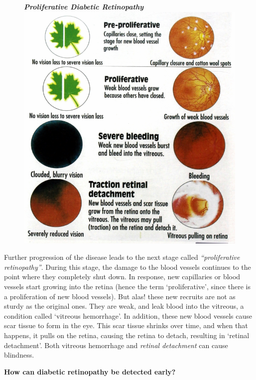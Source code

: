 \begin{figure}
\centering
\textbf{\textit{Proliferative Diabetic Retinopathy}}\\
\includegraphics[scale=1.5]{images/055.jpg}
\end{figure}

Further progression of the disease leads to the next stage called \textit{“proliferative retinopa\-thy”}. During this stage, the damage to the blood vessels continues to the point where they completely shut down. In response, new capillaries or blood vessels start growing into the retina (hence the term ‘proliferative’, since there is a proliferation of new blood vessels). But alas! these new recruits are not as sturdy as the original ones. They are weak, and leak blood into the vitreous, a condition called ‘vitreous hemorrhage’. In addi\-tion, these new blood vessels cause scar tissue to form in the eye. This scar tissue shrinks over time, and when that happens, it pulls on the retina, causing the retina to detach, resulting in ‘retinal deta\-chment’. Both vitreous hemorrhage and \textit{retinal detachment} can cause blindness.

\noindent\textbf{How can diabetic retinopathy be detected early?}

